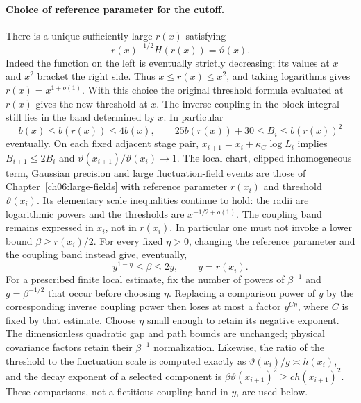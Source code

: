 \paragraph{Choice of reference parameter for the cutoff.}
There is a unique sufficiently large $r(x)$ satisfying
\[
 r(x)^{-1/2}H(r(x))=\vartheta(x).
\]
Indeed the function on the left is eventually strictly decreasing;
its values at $x$ and $x^2$ bracket the right side. Thus
$x\le r(x)\le x^2$, and taking logarithms gives
$r(x)=x^{1+o(1)}$. With this choice the original threshold formula evaluated at $r(x)$
gives the new threshold at $x$. The inverse coupling in the block
integral still lies in the band determined by $x$. In particular
\[
 b(x)\le b(r(x))\le4b(x),\qquad
 25b(r(x))+30\le B_i\le b(r(x))^2
\]
eventually. On each fixed adjacent stage pair,
$x_{i+1}=x_i+\kappa_G\log L_i$ implies
$B_{i+1}\le2B_i$ and
$\vartheta(x_{i+1})/\vartheta(x_i)\to1$.
The local chart, clipped inhomogeneous term, Gaussian precision and large fluctuation-field events
are those of Chapter~\ref{ch06:large-fields} with reference parameter $r(x_i)$
and threshold $\vartheta(x_i)$. Its elementary scale inequalities
continue to hold: the radii are logarithmic powers and the thresholds
are $x^{-1/2+o(1)}$. The coupling band remains expressed in
$x_i$, not in $r(x_i)$. In particular one must not invoke a lower
bound $\beta\ge r(x_i)/2$. For every fixed $\eta>0$, changing the reference parameter and
the coupling band instead give, eventually,
\[
 y^{1-\eta}\le\beta\le2y,\qquad y=r(x_i).
\]
For a prescribed finite local estimate, fix the number of powers
of $\beta^{-1}$ and $g=\beta^{-1/2}$ that occur before choosing
$\eta$. Replacing a comparison power of $y$ by the corresponding
inverse coupling power then loses at most a factor $y^{C\eta}$, where $C$
is fixed by that estimate. Choose $\eta$ small enough to retain
its negative exponent. The dimensionless quadratic gap and path
bounds are unchanged; physical covariance factors retain their
$\beta^{-1}$ normalization. Likewise, the ratio of the threshold to the
fluctuation scale is computed exactly as
$\vartheta(x_i)/g\asymp h(x_i)$, and the decay exponent of a selected component
is $\beta\vartheta(x_{i+1})^2\ge c h(x_{i+1})^2$.
These comparisons, not a fictitious coupling band in $y$, are
used below.

